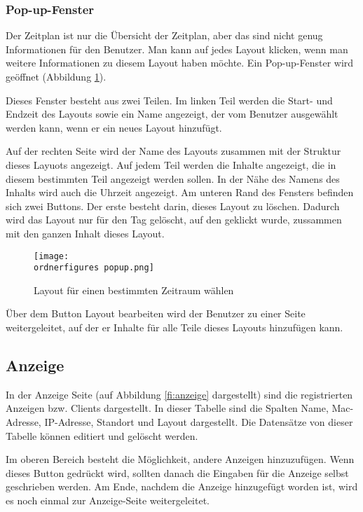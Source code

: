\subsubsection{Pop-up-Fenster}

Der Zeitplan ist nur die Übersicht der Zeitplan, aber das sind nicht genug Informationen für den Benutzer. Man kann auf jedes Layout klicken, wenn man weitere Informationen zu diesem Layout haben möchte. Ein Pop-up-Fenster wird geöffnet (Abbildung \ref{fi:popup}). 

Dieses Fenster besteht aus zwei Teilen. Im linken Teil werden die Start- und Endzeit des Layouts sowie ein Name angezeigt, der vom Benutzer ausgewählt werden kann, wenn er ein neues Layout hinzufügt.

Auf der rechten Seite wird der Name des Layouts zusammen mit der Struktur dieses Layuots angezeigt.
Auf jedem Teil werden die Inhalte angezeigt, die in diesem bestimmten Teil angezeigt werden sollen. In der Nähe des Namens des Inhalts wird auch die Uhrzeit angezeigt.
Am unteren Rand des Fensters befinden sich zwei Buttons. Der erste besteht darin, dieses Layout zu löschen. Dadurch wird das Layout nur für den Tag gelöscht, auf den geklickt wurde, zussammen mit den ganzen Inhalt dieses Layout.

\begin{figure}[ht]
	\centering
	\texttt{[image: \\ordnerfigures popup.png]}
	\caption{Layout  für einen bestimmten Zeitraum wählen}
	\label{fi:popup}
\end{figure}

Über dem Button Layout bearbeiten wird der Benutzer zu einer Seite weitergeleitet, auf der er Inhalte für alle Teile dieses Layouts hinzufügen kann.


\subsection{Anzeige}

In der Anzeige Seite (auf Abbildung \ref{fi:anzeige} dargestellt) sind die registrierten Anzeigen bzw. Clients dargestellt. In dieser Tabelle sind die Spalten Name, Mac-Adresse, IP-Adresse, Standort und Layout dargestellt. Die Datensätze von dieser Tabelle können editiert und gelöscht werden. 

Im oberen Bereich besteht die Möglichkeit, andere Anzeigen hinzuzufügen.
Wenn dieses Button gedr\"uckt wird, sollten danach die Eingaben für die Anzeige selbst geschrieben werden. Am Ende, nachdem die Anzeige hinzugefügt worden ist, wird es noch einmal zur Anzeige-Seite weitergeleitet.

